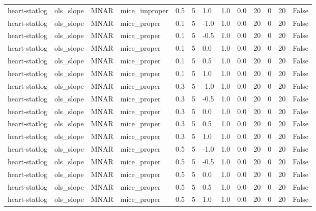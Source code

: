 \begin{tabular}{lllllllllllll}
heart-statlog & ols\_slope & MNAR & mice\_improper & 0.5 & 5 & 1.0 & 1.0 & 0.0 & 20 & 0 & 20 & False \\
heart-statlog & ols\_slope & MNAR & mice\_proper & 0.1 & 5 & -1.0 & 1.0 & 0.0 & 20 & 0 & 20 & False \\
heart-statlog & ols\_slope & MNAR & mice\_proper & 0.1 & 5 & -0.5 & 1.0 & 0.0 & 20 & 0 & 20 & False \\
heart-statlog & ols\_slope & MNAR & mice\_proper & 0.1 & 5 & 0.0 & 1.0 & 0.0 & 20 & 0 & 20 & False \\
heart-statlog & ols\_slope & MNAR & mice\_proper & 0.1 & 5 & 0.5 & 1.0 & 0.0 & 20 & 0 & 20 & False \\
heart-statlog & ols\_slope & MNAR & mice\_proper & 0.1 & 5 & 1.0 & 1.0 & 0.0 & 20 & 0 & 20 & False \\
heart-statlog & ols\_slope & MNAR & mice\_proper & 0.3 & 5 & -1.0 & 1.0 & 0.0 & 20 & 0 & 20 & False \\
heart-statlog & ols\_slope & MNAR & mice\_proper & 0.3 & 5 & -0.5 & 1.0 & 0.0 & 20 & 0 & 20 & False \\
heart-statlog & ols\_slope & MNAR & mice\_proper & 0.3 & 5 & 0.0 & 1.0 & 0.0 & 20 & 0 & 20 & False \\
heart-statlog & ols\_slope & MNAR & mice\_proper & 0.3 & 5 & 0.5 & 1.0 & 0.0 & 20 & 0 & 20 & False \\
heart-statlog & ols\_slope & MNAR & mice\_proper & 0.3 & 5 & 1.0 & 1.0 & 0.0 & 20 & 0 & 20 & False \\
heart-statlog & ols\_slope & MNAR & mice\_proper & 0.5 & 5 & -1.0 & 1.0 & 0.0 & 20 & 0 & 20 & False \\
heart-statlog & ols\_slope & MNAR & mice\_proper & 0.5 & 5 & -0.5 & 1.0 & 0.0 & 20 & 0 & 20 & False \\
heart-statlog & ols\_slope & MNAR & mice\_proper & 0.5 & 5 & 0.0 & 1.0 & 0.0 & 20 & 0 & 20 & False \\
heart-statlog & ols\_slope & MNAR & mice\_proper & 0.5 & 5 & 0.5 & 1.0 & 0.0 & 20 & 0 & 20 & False \\
heart-statlog & ols\_slope & MNAR & mice\_proper & 0.5 & 5 & 1.0 & 1.0 & 0.0 & 20 & 0 & 20 & False \\
\hline
\end{tabular}
